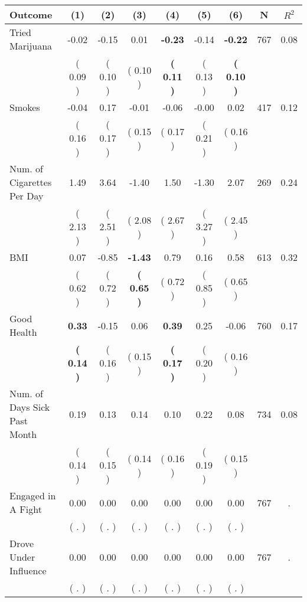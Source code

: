 \begin{tabular}{lcccccccc}
\toprule
 \textbf{Outcome} & \textbf{(1)} & \textbf{(2)} & \textbf{(3)} & \textbf{(4)} & \textbf{(5)} & \textbf{(6)} & \textbf{N} & \textbf{$ R^2$} \\
\midrule
Tried Marijuana &     -0.02 &     -0.15 &      0.01 & \textbf{    -0.23} &     -0.14 & \textbf{    -0.22} & 767 &       0.08 \\ 
 & (     0.09 ) & (     0.10 ) & (     0.10 ) & \textbf{(     0.11 )} & (     0.13 ) & \textbf{(     0.10 )} & \\
Smokes &     -0.04 &      0.17 &     -0.01 &     -0.06 &     -0.00 &      0.02 & 417 &       0.12 \\ 
 & (     0.16 ) & (     0.17 ) & (     0.15 ) & (     0.17 ) & (     0.21 ) & (     0.16 ) & \\
Num. of Cigarettes Per Day &      1.49 &      3.64 &     -1.40 &      1.50 &     -1.30 &      2.07 & 269 &       0.24 \\ 
 & (     2.13 ) & (     2.51 ) & (     2.08 ) & (     2.67 ) & (     3.27 ) & (     2.45 ) & \\
BMI &      0.07 &     -0.85 & \textbf{    -1.43} &      0.79 &      0.16 &      0.58 & 613 &       0.32 \\ 
 & (     0.62 ) & (     0.72 ) & \textbf{(     0.65 )} & (     0.72 ) & (     0.85 ) & (     0.65 ) & \\
Good Health & \textbf{     0.33} &     -0.15 &      0.06 & \textbf{     0.39} &      0.25 &     -0.06 & 760 &       0.17 \\ 
 & \textbf{(     0.14 )} & (     0.16 ) & (     0.15 ) & \textbf{(     0.17 )} & (     0.20 ) & (     0.16 ) & \\
Num. of Days Sick Past Month &      0.19 &      0.13 &      0.14 &      0.10 &      0.22 &      0.08 & 734 &       0.08 \\ 
 & (     0.14 ) & (     0.15 ) & (     0.14 ) & (     0.16 ) & (     0.19 ) & (     0.15 ) & \\
Engaged in A Fight &      0.00 &      0.00 &      0.00 &      0.00 &      0.00 &      0.00 & 767 &          . \\ 
 & (        . ) & (        . ) & (        . ) & (        . ) & (        . ) & (        . ) & \\
Drove Under Influence &      0.00 &      0.00 &      0.00 &      0.00 &      0.00 &      0.00 & 767 &          . \\ 
 & (        . ) & (        . ) & (        . ) & (        . ) & (        . ) & (        . ) & \\

\end{tabular}
